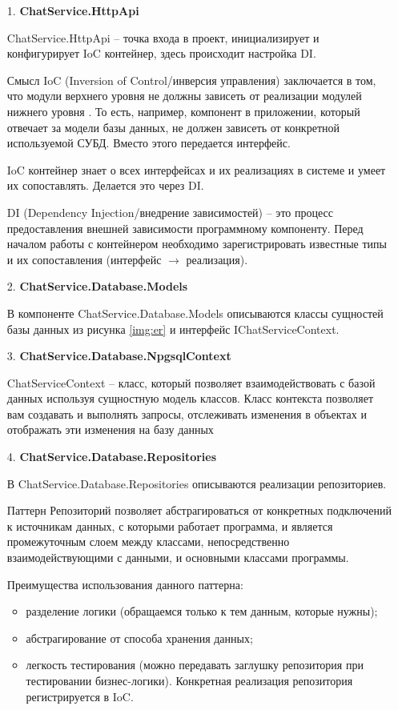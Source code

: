 \begin{enumerate}
\item[1. ] \textbf{ChatService.HttpApi}

ChatService.HttpApi -- точка входа в проект, инициализирует и конфигурирует IoC контейнер, здесь происходит настройка DI. 

Смысл IoC (Inversion of Control/инверсия управления) заключается в том, что модули верхнего уровня не должны зависеть от реализации модулей нижнего уровня \cite{solid}. То есть, например, компонент в приложении, который отвечает за модели базы данных, не должен зависеть от конкретной используемой СУБД. Вместо этого передается интерфейс.

IoC контейнер знает о всех интерфейсах и их реализациях в системе и умеет их сопоставлять. Делается это через DI. 

DI (Dependency Injection/внедрение зависимостей) -- это процесс предоставления внешней зависимости программному компоненту. Перед началом работы с контейнером необходимо зарегистрировать известные типы и их сопоставления (интерфейс $\longrightarrow$ реализация).

\item[2. ] \textbf{ChatService.Database.Models}

В компоненте ChatService.Database.Models описываются классы сущностей базы данных из рисунка \ref{img:er} и интерфейс IChatServiceContext. 

\item[3. ] \textbf{ChatService.Database.NpgsqlContext}

ChatServiceContext -- класс, который позволяет взаимодействовать с базой данных используя сущностную модель классов. Класс контекста позволяет вам создавать и выполнять запросы, отслеживать изменения в объектах и отображать эти изменения на базу данных

\item[4. ] \textbf{ChatService.Database.Repositories}

В ChatService.Database.Repositories описываются реализации репозиториев. 

Паттерн Репозиторий позволяет абстрагироваться от конкретных подключений к источникам данных, с которыми работает программа, и является промежуточным слоем между классами, непосредственно взаимодействующими с данными, и основными классами программы.

Преимущества использования данного паттерна:
\begin{itemize}
\item разделение логики (обращаемся только к тем данным, которые нужны);
\item абстрагирование от способа хранения данных;
\item легкость тестирования (можно передавать заглушку репозитория при тестировании бизнес-логики). Конкретная реализация репозитория регистрируется в IoC. 
\end{itemize}


\end{enumerate}
